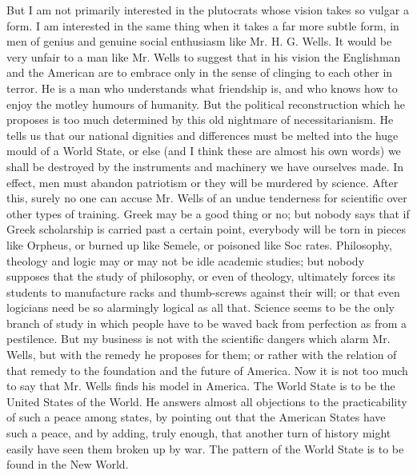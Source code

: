 \documentclass{book}
\begin{document}
But I am not primarily interested in the plutocrats whose vision takes so vulgar a form. I am interested in the same thing when it takes a far more subtle form, in men of genius and genuine social enthusiasm like Mr. H. G. Wells. It would be very unfair to a man like Mr. Wells to suggest that in his vision the Englishman and the American are to embrace only in the sense of clinging to each other in terror. He is a man who understands what friendship is, and who knows how to enjoy the motley humours of humanity. But the political reconstruction which he proposes is too much determined by this old nightmare of necessitarianism. He tells us that our national dignities and differences must be melted into the huge mould of a World State, or else (and I think these are almost his own words) we shall be destroyed by the instruments and machinery we have ourselves made. In effect, men must abandon patriotism or they will be murdered by science. After this, surely no one can accuse Mr. Wells of an undue tenderness for scientific over other types of training. Greek may be a good thing or no; but nobody says that if Greek scholarship is carried past a certain point, everybody will be torn in pieces like Orpheus, or burned up like Semele, or poisoned like Soc rates. Philosophy, theology and logic may or may not be idle academic studies; but nobody supposes that the study of philosophy, or even of theology, ultimately forces its students to manufacture racks and thumb-screws against their will; or that even logicians need be so alarmingly logical as all that. Science seems to be the only branch of study in which people have to be waved back from perfection as from a pestilence. But my business is not with the scientific dangers which alarm Mr. Wells, but with the remedy he proposes for them; or rather with the relation of that remedy to the foundation and the future of America. Now it is not too much to say that Mr. Wells finds his model in America. The World State is to be the United States of the World. He answers almost all objections to the practicability of such a peace among states, by pointing out that the American States have such a peace, and by adding, truly enough, that another turn of history might easily have seen them broken up by war. The pattern of the World State is to be found in the New World.
\end{document}
